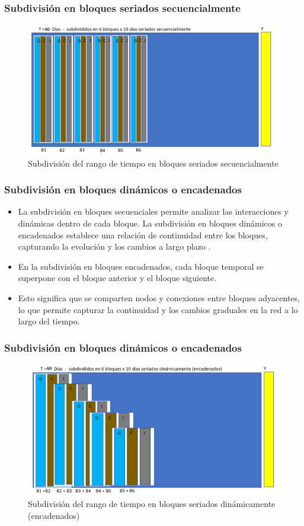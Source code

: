 \documentclass{beamer}
\begin{document}
\begin{frame}
	\frametitle{Subdivisión en bloques seriados secuencialmente}
	\begin{figure}
		\centering
		\includegraphics[width=0.7\linewidth]{figs/imagen20}
		\caption{Subdivisión del rango de tiempo en bloques seriados secuencialmente}
		\label{fig:imagen320}
	\end{figure}
	
\end{frame}


\begin{frame}
	\frametitle{Subdivisión en bloques dinámicos o encadenados}
	\begin{itemize}
		\item La subdivisión en bloques secuenciales permite analizar las interacciones y dinámicas dentro de cada bloque. La subdivisión en bloques dinámicos o encadenados establece una relación de continuidad entre los bloques, capturando la evolución y los cambios a largo plazo \citep{Mahmoud_2021}.
		\item En la subdivisión en bloques encadenados, cada bloque temporal se superpone con el bloque anterior y el bloque siguiente. 
		\item Esto significa que se comparten nodos y conexiones entre bloques adyacentes, lo que permite capturar la continuidad y los cambios graduales en la red a lo largo del tiempo.
	\end{itemize}	
\end{frame}

\begin{frame}
	\frametitle{Subdivisión en bloques dinámicos o encadenados}
	\begin{figure}[H]
		\centering
		\includegraphics[width=0.7\linewidth]{figs/imagen21}
		\caption{Subdivisión del rango de tiempo en bloques seriados dinámicamente (encadenados)}
		\label{fig:imagen321}
	\end{figure}
	
\end{frame}
\end{document}
